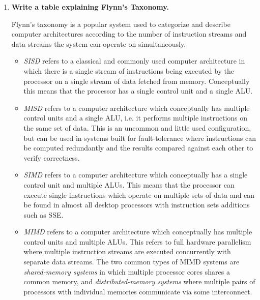 \begin{enumerate}

\item \textbf{Write a table explaining Flynn's Taxonomy.}

Flynn's taxonomy is a popular system used to categorize and describe computer architectures according to the number of instruction streams and data streams the system can operate on simultaneously.

\begin{itemize}

\item \textit{\acf {SISD}} refers to a classical and commonly used computer architecture in which there is a single stream of instructions being executed by the processor on a single stream of data fetched from memory. Conceptually this means that the processor has a single control unit and a single \ac{ALU}.

\item \textit{\acf{MISD}} refers to a computer architecture which conceptually has multiple control units and a single \ac{ALU}, i.e. it performs multiple instructions on the same set of data. This is an uncommon and little used configuration, but can be used in systems built for fault-tolerance where instructions can be computed redundantly and the results compared against each other to verify correctness. \\

\item \textit{\acf{SIMD}} refers to a computer architecture which conceptually has a single control unit and multiple \acp{ALU}. This means that the processor can execute single instructions which operate on multiple sets of data and can be found in almost all desktop processors with instruction sets additions such as \ac{SSE}.

\item \textit{\acf{MIMD}} refers to a computer architecture which conceptually has multiple control units and multiple \acp{ALU}. This refers to full hardware parallelism where multiple instruction streams are executed concurrently with separate data streams. The two common types of \ac{MIMD} systems are \textit{shared-memory systems} in which multiple processor cores shares a common memory, and \textit{distributed-memory systems} where multiple pairs of processors with individual memories communicate via some interconnect.

\end{itemize}


\end{enumerate}
